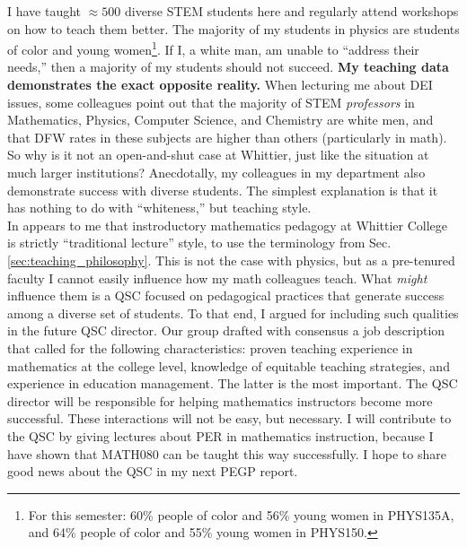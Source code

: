 \documentclass[../../../main.tex]{subfiles}
\begin{document}
I have taught $\approx 500$ diverse STEM students here and regularly attend workshops on how to teach them better.  The majority of my students in physics are students of color and young women\footnote{For this semester: 60\% people of color and 56\% young women in PHYS135A, and 64\% people of color and 55\% young women in PHYS150.}.  If I, a white man, am unable to ``address their needs,'' then a majority of my students should not succeed.  \textbf{My teaching data demonstrates the exact opposite reality.}  When lecturing me about DEI issues, some colleagues point out that the majority of STEM \textit{professors} in Mathematics, Physics, Computer Science, and Chemistry are white men, and that DFW rates in these subjects are higher than others (particularly in math).  So why is it not an open-and-shut case at Whittier, just like the situation at much larger institutions?  Anecdotally, my colleagues in my department also demonstrate success with diverse students.  The simplest explanation is that it has nothing to do with ``whiteness,'' but teaching style.
\\
\vspace{0.25cm}
In appears to me that instroductory mathematics pedagogy at Whittier College is strictly ``traditional lecture'' style, to use the terminology from Sec. \ref{sec:teaching_philosophy}.  This is not the case with physics, but as a pre-tenured faculty I cannot easily influence how my math colleagues teach.  What \textit{might} influence them is a QSC focused on pedagogical practices that generate success among a diverse set of students.  To that end, I argued for including such qualities in the future QSC director.  Our group drafted with consensus a job description that called for the following characteristics: proven teaching experience in mathematics at the college level, knowledge of equitable teaching strategies, and experience in education management.  The latter is the most important.  The QSC director will be responsible for helping mathematics instructors become more successful.  These interactions will not be easy, but necessary.  I will contribute to the QSC by giving lectures about PER in mathematics instruction, because I have shown that MATH080 can be taught this way successfully.  I hope to share good news about the QSC in my next PEGP report.
\end{document}
